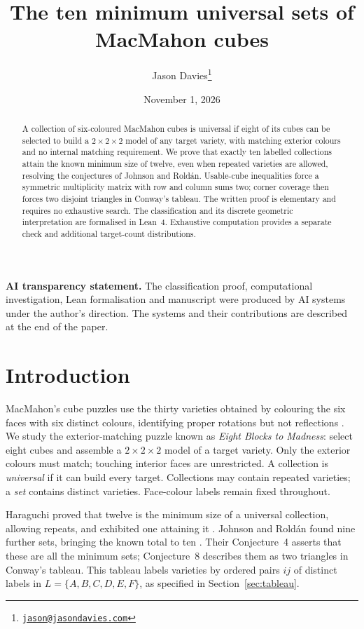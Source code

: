 \documentclass[11pt]{article}
\title{The ten minimum universal sets of MacMahon cubes}
\author{Jason Davies\thanks{\href{mailto:jason@jasondavies.com}{\nolinkurl{jason@jasondavies.com}}}}
\date{November 1, 2026}
\begin{document}
\maketitle
\begin{abstract}
A collection of six-coloured MacMahon cubes is universal if eight of its
cubes can be selected to build a $2\times2\times2$ model of any target
variety, with matching exterior colours and no internal matching requirement.
We prove that exactly ten labelled collections attain the known minimum
size of twelve, even when repeated varieties are allowed, resolving the
conjectures of Johnson and Rold\'an. Usable-cube inequalities force a
symmetric multiplicity matrix with row and column sums two; corner coverage
then forces two disjoint triangles in Conway's tableau. The written proof
is elementary and requires no exhaustive search. The classification and its
discrete geometric interpretation are formalised in Lean~4. Exhaustive
computation provides a separate check and additional target-count
distributions.
\end{abstract}

\noindent\textbf{AI transparency statement.} The classification proof,
computational investigation, Lean formalisation and manuscript were produced
by AI systems under the author's direction. The systems and their
contributions are described at the end of the paper.

\section{Introduction}
MacMahon's cube puzzles use the thirty varieties obtained by colouring the
six faces with six distinct colours, identifying proper rotations but not
reflections \cite[pp.~42--46]{MacMahon}. We study the exterior-matching
puzzle known as \emph{Eight Blocks to Madness}: select eight cubes and
assemble a $2\times2\times2$ model of a target variety. Only the exterior
colours must match; touching interior faces are unrestricted.
A collection is \emph{universal} if it can build every target.
Collections may contain repeated varieties; a \emph{set} contains distinct
varieties. Face-colour labels remain fixed throughout.

Haraguchi proved that twelve is the minimum size of a universal collection,
allowing repeats, and exhibited one attaining it
\cite[Lemma~2 and Theorem~4]{H}. Johnson and Rold\'an found nine further
sets, bringing the known total to ten \cite[Theorem~3]{JR}. Their Conjecture~4 asserts that these are all the
minimum sets; Conjecture~8 describes them as two triangles in Conway's
tableau. This tableau labels varieties by ordered pairs $ij$ of distinct
labels in $L=\{A,B,C,D,E,F\}$, as specified in Section~\ref{sec:tableau}.
\end{document}

